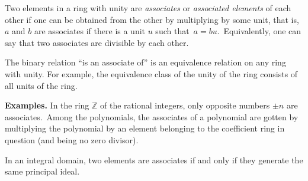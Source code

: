\documentclass{article}
\begin{document}
Two elements in a ring with unity are \emph{associates} or {\em associated elements} of each other
if one can be obtained from the other by multiplying by some unit,
that is, $a$ and $b$ are associates if there is a unit $u$ such that\,
$a = bu$.\, Equivalently, one can say that two associates are divisible by each other.

The binary relation ``is an associate of'' is an equivalence relation
on any ring with unity.  For example, the equivalence class of the
unity of the ring consists of all units of the ring.

\textbf{Examples.} In the ring $\mathbb{Z}$ of the rational integers, only opposite numbers $\pm n$ are associates.\, Among the polynomials, the associates of a polynomial are gotten by multiplying the polynomial by an element belonging to the coefficient ring in question (and being no zero divisor).

In an integral domain, two elements are associates if and only if they
generate the same principal ideal.
\end{document}
